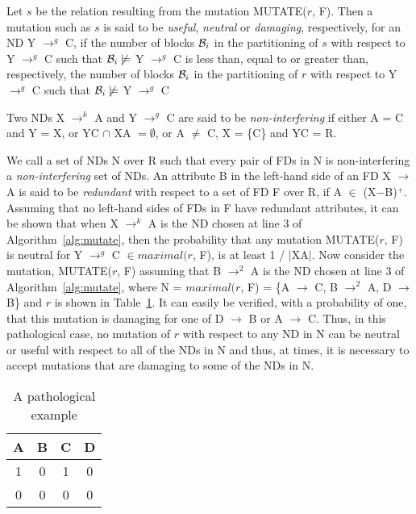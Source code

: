 \begin{definition}
\begin{rm}
Let $s$ be the relation resulting from the mutation MUTATE($r$, F).
Then a mutation such as $s$ is said to be {\em useful}, {\em neutral} or 
{\em damaging}, respectively, for an ND Y $\to^g$ C,
if the number of blocks ${\cal B}_i$
in the partitioning of $s$ with respect to Y $\to^g$ C
such that ${\cal B}_i \not\models$ Y $\to^g$ C
is less than, equal to or greater than, respectively, 
the number of blocks ${\cal B}_i$ 
in the partitioning of $r$ with respect to Y $\to^g$ C
such that ${\cal B}_i \not\models$ Y $\to^g$ C
\end{rm}
\end{definition}


\begin{definition}
\begin{rm}
Two NDs X $\to^k$ A and Y $\to^g$ C are said to be {\em non-interfering} if 
either A = C and Y = X, or YC $\cap$ XA $= \emptyset$, 
or A $\not=$ C, X = \{C\} and YC = R.
\end{rm}
\end{definition}
\medskip

We call a set of NDs N over R such that every pair of FDs in N is
non-interfering a {\em non-interfering} set of NDs.
An attribute B in the left-hand side of an FD X $\to$ A is said to be 
{\em redundant} with respect to a set of FD F over R, if A $\in$ (X$-$B)${}^+$.
Assuming that no left-hand sides of FDs in F have redundant attributes,
it can be shown that when X $\to^k$ A is the ND chosen at line 3 of 
Algorithm~\ref{alg:mutate}, then the probability that any mutation MUTATE($r$, F)
is neutral for Y $\to^g$ C $\in maximal(r$, F), is at least 1 / $\mid$XA$\mid$.
Now consider the mutation, MUTATE($r$, F) assuming that 
B $\to^2$ A is the ND chosen at line 3 of Algorithm~\ref{alg:mutate},
where N = $maximal(r$, F) = \{A $\to$ C, B $\to^2$ A, D $\to$ B\}
and $r$ is shown in Table~\ref{tbl17}.
It can easily be verified, with a probability of one, that this mutation is 
damaging for one of D $\to$ B or A $\to$ C.
Thus, in this pathological case, no mutation of $r$ with respect to 
any ND in N can be neutral or useful with respect to all of the NDs in N
and thus, at times, it is necessary to accept mutations that are damaging 
to some of the NDs in N. 

{\line
\begin{table}[ht]
\begin{center}
\begin{tabular}{|c|c|c|c|} \hline
A & B & C & D \\ \hline
1 & 0 & 1 & 0 \\
0 & 0 & 0 & 0 \\ \hline
\end{tabular}
\end{center}
\caption{\label{tbl17} A pathological example}
\end{table}
}
\medskip


